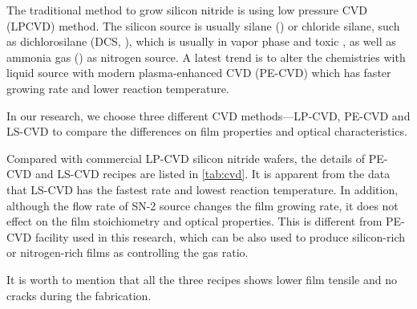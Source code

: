 The traditional method to grow silicon nitride is using low pressure CVD (LPCVD) method. The silicon source is usually silane () or chloride silane, such as dichlorosilane (DCS, ), which is usually in vapor phase and toxic \cite{Kaloyeros2017}, as well as ammonia gas () as nitrogen source. A latest trend is to alter the chemistries with liquid source with modern plasma-enhanced CVD (PE-CVD) which has faster growing rate and lower reaction temperature.


In our research, we choose three different CVD methods---LP-CVD, PE-CVD and LS-CVD 
to compare the differences on film properties and optical characteristics.  

Compared with commercial LP-CVD silicon nitride wafers,
the details of PE-CVD and LS-CVD recipes are listed in \autoref{tab:cvd}. It is apparent from the data that LS-CVD has the fastest rate and lowest reaction temperature. In addition, although the flow rate of SN-2 source changes the film growing rate, it does not effect on the film stoichiometry and optical properties. This is different from PE-CVD facility used in this research, which can be also used to produce silicon-rich or nitrogen-rich films as controlling the gas ratio.

It is worth to mention that all the three recipes shows lower film tensile and no cracks during the fabrication.

